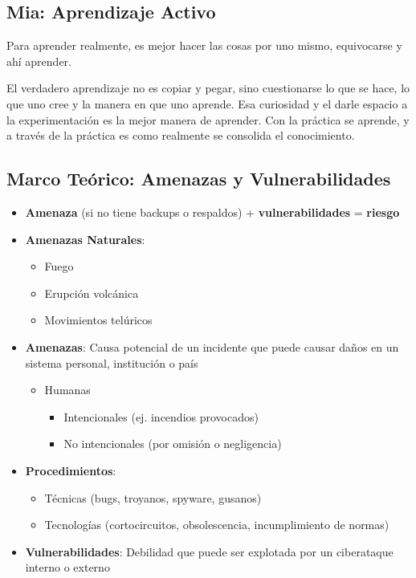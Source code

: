 \documentclass[12pt,a4paper]{article}
\begin{document}
\subsection{Mia: Aprendizaje Activo}

Para aprender realmente, es mejor hacer las cosas por uno mismo, equivocarse y ahí aprender. 

El verdadero aprendizaje no es copiar y pegar, sino cuestionarse lo que se hace, lo que uno cree y la manera en que uno aprende. Esa curiosidad y el darle espacio a la experimentación es la mejor manera de aprender. Con la práctica se aprende, y a través de la práctica es como realmente se consolida el conocimiento.

\subsection{Marco Teórico: Amenazas y Vulnerabilidades}

\begin{itemize}
    \item \textbf{Amenaza} (si no tiene backups o respaldos) + \textbf{vulnerabilidades} = \textbf{riesgo}
    \item \textbf{Amenazas Naturales}:
    \begin{itemize}
        \item Fuego
        \item Erupción volcánica
        \item Movimientos telúricos
    \end{itemize}
    \item \textbf{Amenazas}: Causa potencial de un incidente que puede causar daños en un sistema personal, institución o país
    \begin{itemize}
        \item Humanas
        \begin{itemize}
            \item Intencionales (ej. incendios provocados)
            \item No intencionales (por omisión o negligencia)
        \end{itemize}
    \end{itemize}
    \item \textbf{Procedimientos}:
    \begin{itemize}
        \item Técnicas (bugs, troyanos, spyware, gusanos)
        \item Tecnologías (cortocircuitos, obsolescencia, incumplimiento de normas)
    \end{itemize}
    \item \textbf{Vulnerabilidades}: Debilidad que puede ser explotada por un ciberataque interno o externo
\end{itemize}
\end{document}
